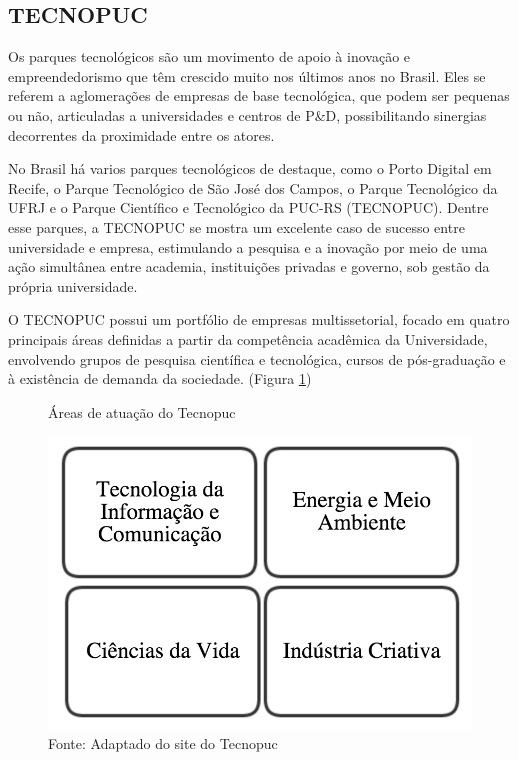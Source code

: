 \subsection{TECNOPUC}

Os parques tecnológicos são um movimento de apoio à inovação e empreendedorismo que têm crescido muito nos últimos anos no Brasil. Eles se referem a aglomerações de empresas de base tecnológica, que podem ser pequenas ou não, articuladas a universidades e centros de P\&D, possibilitando sinergias decorrentes da proximidade entre os atores. \cite{parquestecnologicos} 

No Brasil há varios parques tecnológicos de destaque, como o Porto Digital em Recife, o Parque Tecnológico de São José dos Campos, o Parque Tecnológico da UFRJ e o Parque Científico e Tecnológico da PUC-RS (TECNOPUC). Dentre esse parques, a TECNOPUC se mostra um excelente caso de sucesso entre universidade e empresa, estimulando a pesquisa e a inovação por meio de uma ação simultânea entre academia, instituições privadas e governo, sob gestão da própria universidade.

O TECNOPUC possui um portfólio de empresas multissetorial, focado em quatro principais áreas definidas a partir da competência acadêmica da Universidade, envolvendo grupos de pesquisa científica e tecnológica, cursos de pós-graduação e à existência de demanda da sociedade. (Figura \ref{fig:tecnopuc})

\begin{figure}
\caption{Áreas de atuação do Tecnopuc}
\centerline{\includegraphics[scale=0.5]{img/tecnopuc}}
\label{fig:tecnopuc}
\caption* {Fonte: Adaptado do site do Tecnopuc}
\end{figure}

